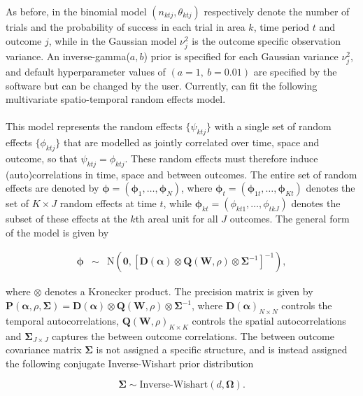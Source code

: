 \documentclass[article, nojss]{jss}
\begin{document}
As before, in the binomial model $(n_{ktj}, \theta_{ktj})$ respectively denote the number of trials and the probability of success in each trial in area $k$, time period $t$ and outcome $j$, while in the Gaussian model $\nu^2_j$ is the outcome specific observation variance. An inverse-gamma($a,b$) prior is specified for each Gaussian variance $\nu^2_j$, and default hyperparameter values of $(a=1,~ b=0.01)$  are specified by the software but can be changed by the user. Currently,  can fit the following multivariate spatio-temporal random effects model.\\ 


\\
This model represents the random effects $\{\psi_{ktj}\}$ with a single set of random effects $\{\phi_{ktj}\}$ that are modelled as jointly correlated over time, space and outcome, so that $\psi_{ktj}=\phi_{ktj}$. These random effects must therefore induce (auto)correlations in time, space and between outcomes. The entire set of random effects are denoted by $\boldsymbol{\phi}=(\boldsymbol{\phi}_1,\ldots, \boldsymbol{\phi}_N)$, where $\boldsymbol{\phi}_t=(\boldsymbol{\phi}_{1t}, \ldots, \boldsymbol{\phi}_{Kt})$ denotes the set of $K\times J$ random effects at time $t$, while $\boldsymbol{\phi}_{kt}=(\phi_{kt1},\ldots, \phi_{tkJ})$ denotes the subset of these effects at the $k$th areal unit for all $J$ outcomes. The general form of the model is given by

\begin{eqnarray}
\boldsymbol{\phi} &\sim& \mbox{N}\left(\mathbf{0}, \left[\mathbf{D}(\boldsymbol{\alpha}) \otimes \mathbf{Q}(\mathbf{W}, \rho)\otimes \boldsymbol{\Sigma}^{-1}\right]^{-1} \right),\label{eq_joint}
\end{eqnarray}

where $\otimes$ denotes a Kronecker product. The precision matrix is given by  $\mathbf{P}(\boldsymbol{\alpha},\rho, \boldsymbol{\Sigma})=\mathbf{D}(\boldsymbol{\alpha}) \otimes \mathbf{Q}(\mathbf{W}, \rho)\otimes \boldsymbol{\Sigma}^{-1}$, where $\mathbf{D}(\boldsymbol{\alpha})_{N\times N}$ controls the temporal autocorrelations, $\mathbf{Q}(\mathbf{W}, \rho)_{K\times K}$ controls the spatial autocorrelations and $\boldsymbol{\Sigma}_{J\times J}$ captures the between outcome correlations. The between outcome covariance matrix  $\boldsymbol{\Sigma}$ is not assigned a specific structure, and is instead assigned the following conjugate Inverse-Wishart prior distribution

\begin{equation}
    \boldsymbol{\Sigma}\sim\mbox{Inverse-Wishart}(d, \boldsymbol{\Omega}).
\end{equation}
\end{document}
